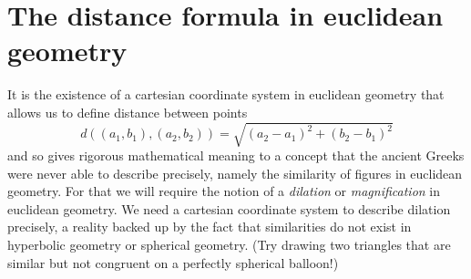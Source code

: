 \documentclass[newpage,hints,handout]{ximera}
\begin{document}
\section*{The distance formula in euclidean geometry}

It is the existence of a cartesian coordinate system in euclidean geometry that
allows us to define distance between points%
\[
d\left( (a_{1},b_{1}), (a_{2},b_{2}) \right)
=\sqrt{(a_{2}-a_{1})^{2}+(b_{2}-b_{1})^{2}}
\]
and so gives rigorous mathematical meaning to a concept that the
ancient Greeks were never able to describe precisely, namely the
similarity of figures in euclidean geometry. For that we will require the
notion of a \textit{dilation} or \textit{magnification} in
euclidean geometry. We need a cartesian coordinate system to describe
dilation precisely, a reality backed up by the fact that similarities
do not exist in hyperbolic geometry or spherical geometry. (Try drawing two triangles
that are similar but not congruent on a perfectly spherical balloon!)
\end{document}
